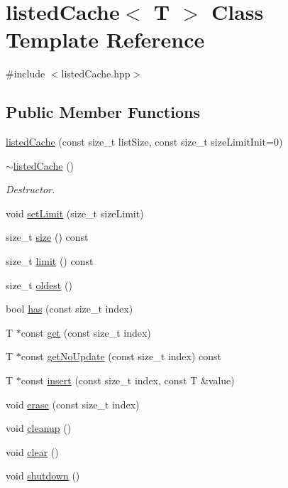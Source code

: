 \hypertarget{classlistedCache}{\section{listed\-Cache$<$ \-T $>$ \-Class \-Template \-Reference}
\label{classlistedCache}
}


{\ttfamily \#include $<$listed\-Cache.\-hpp$>$}

\subsection*{\-Public \-Member \-Functions}
\begin{DoxyCompactItemize}
\item 
\hyperlink{classlistedCache_ab0f705bf294d1bc297d4b9759daa6502}{listed\-Cache} (const size\-\_\-t list\-Size, const size\-\_\-t size\-Limit\-Init=0)
\item 
\hypertarget{classlistedCache_a259666475bddc8dca98589b4ed98ec59}{\hyperlink{classlistedCache_a259666475bddc8dca98589b4ed98ec59}{$\sim$listed\-Cache} ()}\label{classlistedCache_a259666475bddc8dca98589b4ed98ec59}

\begin{DoxyCompactList}\small\item\em \-Destructor. \end{DoxyCompactList}\item 
void \hyperlink{classlistedCache_a69adba97699af42c88429b4ff66a026d}{set\-Limit} (size\-\_\-t size\-Limit)
\item 
size\-\_\-t \hyperlink{classlistedCache_ad5a40a3dc88ae8061eb9a4be7ccd279b}{size} () const 
\item 
size\-\_\-t \hyperlink{classlistedCache_a81f917a3ca4748284469984c19a5d1d0}{limit} () const 
\item 
size\-\_\-t \hyperlink{classlistedCache_ab96879a472161151454d1afed6b97464}{oldest} ()
\item 
bool \hyperlink{classlistedCache_a6f025fc099b2a9688971899c8e928ec5}{has} (const size\-\_\-t index)
\item 
\-T $\ast$const \hyperlink{classlistedCache_af09e35a73993b500e9740e797db4ee45}{get} (const size\-\_\-t index)
\item 
\-T $\ast$const \hyperlink{classlistedCache_aa3ffc76dd61ec63ec396b862bf8d84f0}{get\-No\-Update} (const size\-\_\-t index) const 
\item 
\-T $\ast$const \hyperlink{classlistedCache_a4fe463e0e4fec0aa8cc48e005fdf6325}{insert} (const size\-\_\-t index, const \-T \&value)
\item 
void \hyperlink{classlistedCache_a5958558d6cb1a31a2f2343ddca20f7e5}{erase} (const size\-\_\-t index)
\item 
void \hyperlink{classlistedCache_a92febe1b16ddb282d0f5e2ca9eb1c462}{cleanup} ()
\item 
void \hyperlink{classlistedCache_add33fbae1be6a7f3aaa6b052587f1619}{clear} ()
\item 
void \hyperlink{classlistedCache_a8d1fd081caa2ea552bd5038a3a38ab69}{shutdown} ()
\end{DoxyCompactItemize}


